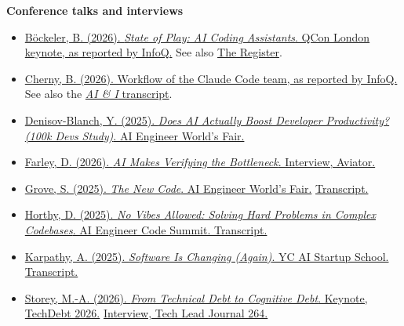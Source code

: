 \documentclass[11pt]{article}
\begin{document}
\textbf{Conference talks and interviews}
\begin{itemize}[leftmargin=*]
  \item \href{https://infoq.com/news/2026/03/ai-coding-state}{B\"ockeler, B. (2026). \emph{State of Play: AI Coding Assistants}. QCon London keynote, as reported by InfoQ.} See also \href{https://www.theregister.com/software/2026/03/18/qcon-london-ai-for-developers-is-in-a-dangerous-state/5221919}{The Register}.
  \item \href{https://infoq.com/news/2026/01/claude-code-creator-workflow/}{Cherny, B. (2026). Workflow of the Claude Code team, as reported by InfoQ.} See also the \href{https://every.to/podcast/transcript-how-to-use-claude-code-like-the-people-who-built-it}{\emph{AI \& I} transcript}.
  \item \href{https://ai.engineer/talks/tbDDYKRFjhk-ai-developer-productivity}{Denisov-Blanch, Y. (2025). \emph{Does AI Actually Boost Developer Productivity? (100k Devs Study)}. AI Engineer World's Fair.}
  \item \href{https://www.aviator.co/podcast/engineering-discipline-dave-farley}{Farley, D. (2026). \emph{AI Makes Verifying the Bottleneck}. Interview, Aviator.}
  \item \href{https://ai.engineer/talks/8rABwKRsec4-specifications-are-the-new-code}{Grove, S. (2025). \emph{The New Code}. AI Engineer World's Fair.} \href{https://lawwu.github.io/transcripts/8rABwKRsec4.html}{Transcript.}
  \item \href{https://www.usetranscribe.io/yt/rmvDxxNubIg/ai-in-software}{Horthy, D. (2025). \emph{No Vibes Allowed: Solving Hard Problems in Complex Codebases}. AI Engineer Code Summit. Transcript.}
  \item \href{https://singjupost.com/andrej-karpathy-software-is-changing-again/}{Karpathy, A. (2025). \emph{Software Is Changing (Again)}. YC AI Startup School. Transcript.}
  \item \href{https://conf.researchr.org/details/TechDebt-2026/TechDebt-2026-techdebt-program/3/From-Technical-Debt-to-Cognitive-Debt}{Storey, M.-A. (2026). \emph{From Technical Debt to Cognitive Debt}. Keynote, TechDebt 2026.} \href{https://techleadjournal.dev/episodes/264/}{Interview, Tech Lead Journal 264.}
\end{itemize}
\end{document}
